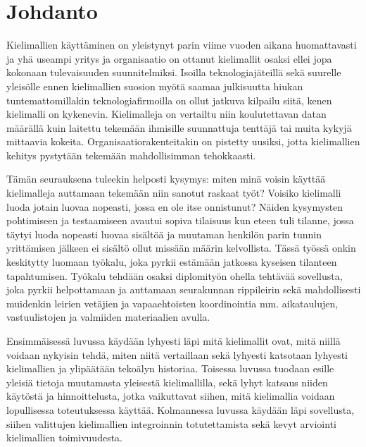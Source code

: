 \chapter{Johdanto}
\label{ch:johdanto}

Kielimallien käyttäminen on yleistynyt parin viime vuoden aikana huomattavasti
ja yhä useampi yritys ja organisaatio on ottanut kielimallit osaksi ellei jopa
kokonaan tulevaisuuden suunnitelmiksi. Isoilla teknologiajäteillä sekä suurelle
yleisölle ennen kielimallien suosion myötä saamaa julkisuutta hiukan
tuntemattomillakin teknologiafirmoilla on ollut jatkuva kilpailu siitä, kenen
kielimalli on kykenevin. Kielimalleja on vertailtu niin koulutettavan datan
määrällä kuin laitettu tekemään ihmisille suunnattuja tenttäjä tai muita kykyjä
mittaavia kokeita. Organisaatiorakenteitakin on pistetty uusiksi, jotta
kielimallien kehitys pystytään tekemään mahdollisimman tehokkaasti.

Tämän seurauksena tuleekin helposti kysymys: miten minä voisin käyttää
kielimalleja auttamaan tekemään niin sanotut raskaat työt? Voisiko kielimalli
luoda jotain luovaa nopeasti, jossa en ole itse onnistunut? Näiden kysymysten
pohtimiseen ja testaamiseen avautui sopiva tilaisuus kun eteen tuli tilanne,
jossa täytyi luoda nopeasti luovaa sisältöä ja muutaman henkilön parin tunnin
yrittämisen jälkeen ei sisältö ollut missään määrin kelvollista. Tässä työssä
onkin keskitytty luomaan työkalu, joka pyrkii estämään jatkossa kyseisen
tilanteen tapahtumisen. Työkalu tehdään osaksi diplomityön ohella tehtävää
sovellusta, joka pyrkii helpottamaan ja auttamaan seurakunnan rippileirin sekä
mahdollisesti muidenkin leirien vetäjien ja vapaaehtoisten koordinointia mm.
aikataulujen, vastuulistojen ja valmiiden materiaalien avulla.

Ensimmäisessä luvussa käydään lyhyesti läpi mitä kielimallit ovat, mitä niillä
voidaan nykyisin tehdä, miten niitä vertaillaan sekä lyhyesti katsotaan lyhyesti
kielimallien ja ylipäätään tekoälyn historiaa. Toisessa luvussa tuodaan esille
yleisiä tietoja muutamasta yleisestä kielimallilla, sekä lyhyt katsaus niiden
käytöstä ja hinnoittelusta, jotka vaikuttavat siihen, mitä kielimallia voidaan
lopullisessa toteutuksessa käyttää. Kolmannessa luvussa käydään läpi sovellusta,
siihen valittujen kielimallien integroinnin totutettamista sekä kevyt arviointi
kielimallien toimivuudesta.
